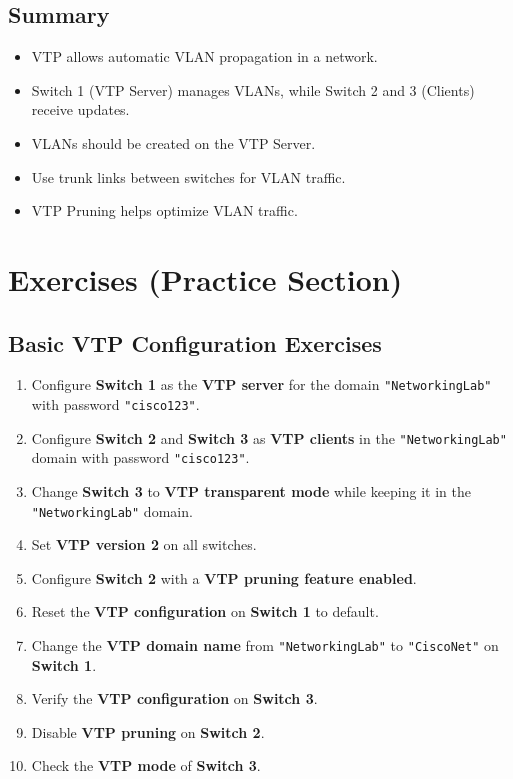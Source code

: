 \documentclass[a4paper]{book}
\begin{document}
\section{Summary}
\begin{itemize}
    \item VTP allows automatic VLAN propagation in a network.
    \item Switch 1 (VTP Server) manages VLANs, while Switch 2 and 3 (Clients) receive updates.
    \item VLANs should be created on the VTP Server.
    \item Use trunk links between switches for VLAN traffic.
    \item VTP Pruning helps optimize VLAN traffic.
\end{itemize}

\chapter{Exercises (Practice Section)}
\section{Basic VTP Configuration Exercises}

\begin{enumerate}
    \item Configure \textbf{Switch 1} as the \textbf{VTP server} for the domain \texttt{"NetworkingLab"} with password \texttt{"cisco123"}.
    \item Configure \textbf{Switch 2} and \textbf{Switch 3} as \textbf{VTP clients} in the \texttt{"NetworkingLab"} domain with password \texttt{"cisco123"}.
    \item Change \textbf{Switch 3} to \textbf{VTP transparent mode} while keeping it in the \texttt{"NetworkingLab"} domain.
    \item Set \textbf{VTP version 2} on all switches.
    \item Configure \textbf{Switch 2} with a \textbf{VTP pruning feature enabled}.
    \item Reset the \textbf{VTP configuration} on \textbf{Switch 1} to default.
    \item Change the \textbf{VTP domain name} from \texttt{"NetworkingLab"} to \texttt{"CiscoNet"} on \textbf{Switch 1}.
    \item Verify the \textbf{VTP configuration} on \textbf{Switch 3}.
    \item Disable \textbf{VTP pruning} on \textbf{Switch 2}.
    \item Check the \textbf{VTP mode} of \textbf{Switch 3}.
\end{enumerate}
\end{document}
